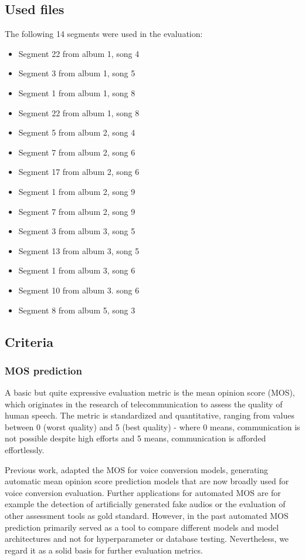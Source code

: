 \documentclass[a4paper]{article}
\begin{document}
	\subsection{Used files}
	The following 14 segments were used in the evaluation:
	\begin{itemize}
		\item Segment 22 from album 1, song 4
		\item Segment 3 from album 1, song 5
		\item Segment 1 from album 1, song 8
		\item Segment 22 from album 1, song 8
		\item Segment 5 from album 2, song 4
		\item Segment 7 from album 2, song 6
		\item Segment 17 from album 2, song 6
		\item Segment 1 from album 2, song 9
		\item Segment 7 from album 2, song 9
		\item Segment 3 from album 3, song 5
		\item Segment 13 from album 3, song 5
		\item Segment 1 from album 3, song 6
		\item Segment 10 from album 3. song 6
		\item Segment 8 from album 5, song 3
	\end{itemize}
	
	\subsection{Criteria}
	
	\subsubsection{MOS prediction}
	
	A basic but quite expressive evaluation metric is the mean opinion score (MOS), which originates in the research of telecommunication to assess the quality of human speech. The metric is standardized and quantitative, ranging from values between 0 (worst quality) and 5 (best quality) - where 0 means, communication is not possible despite high efforts and 5 means, communication is afforded effortlessly. 
	
	Previous work, adapted the MOS for voice conversion models, generating automatic mean opinion score prediction models that are now broadly used for voice conversion evaluation. Further applications for automated MOS are for example the detection of artificially generated fake audios or the evaluation of other assessment tools as gold standard. \cite{Zhou2024} However, in the past automated MOS prediction primarily served as a tool to compare different models and model architectures and not for hyperparameter or database testing. Nevertheless, we regard it as a solid basis for further evaluation metrics.
	
\end{document}
